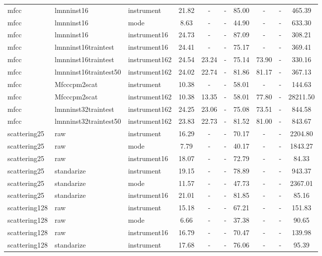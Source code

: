 \begin{table}
\begin{center}
\begin{tabular}{lllccccccc}
mfcc & lmnninst16 & instrument & 21.82 &   - &   - & 85.00 &   - &   - &    465.39 \\ 
mfcc & lmnninst16 & mode &  8.63 &   - &   - & 44.90 &   - &   - &    633.30 \\ 
mfcc & lmnninst16 & instrument16 & 24.73 &   - &   - & 87.09 &   - &   - &    308.21 \\ 
mfcc & lmnninst16traintest & instrument16 & 24.41 &   - &   - & 75.17 &   - &   - &    369.41 \\ 
mfcc & lmnninst16traintest & instrument162 & 24.54 & 23.24 &   - & 75.14 & 73.90 &   - &    330.16 \\ 
mfcc & lmnninst16traintest50 & instrument162 & 24.02 & 22.74 &   - & 81.86 & 81.17 &   - &    367.13 \\ 
mfcc & Mfcccpm2scat & instrument & 10.38 &   - &   - & 58.01 &   - &   - &    144.63 \\ 
mfcc & Mfcccpm2scat & instrument162 & 10.38 & 13.35 &   - & 58.01 & 77.80 &   - &  28211.50 \\ 
mfcc & lmnninst32traintest & instrument162 & 24.25 & 23.06 &   - & 75.08 & 73.51 &   - &    844.58 \\ 
mfcc & lmnninst32traintest50 & instrument162 & 23.83 & 22.73 &   - & 81.52 & 81.00 &   - &    843.67 \\ 
scattering25 & raw & instrument & 16.29 &   - &   - & 70.17 &   - &   - &   2204.80 \\ 
scattering25 & raw & mode &  7.79 &   - &   - & 40.17 &   - &   - &   1843.27 \\ 
scattering25 & raw & instrument16 & 18.07 &   - &   - & 72.79 &   - &   - &     84.33 \\ 
scattering25 & standarize & instrument & 19.15 &   - &   - & 78.89 &   - &   - &    943.37 \\ 
scattering25 & standarize & mode & 11.57 &   - &   - & 47.73 &   - &   - &   2367.01 \\ 
scattering25 & standarize & instrument16 & 21.01 &   - &   - & 81.85 &   - &   - &     85.16 \\ 
scattering128 & raw & instrument & 15.18 &   - &   - & 67.21 &   - &   - &    151.83 \\ 
scattering128 & raw & mode &  6.66 &   - &   - & 37.38 &   - &   - &     90.65 \\ 
scattering128 & raw & instrument16 & 16.79 &   - &   - & 70.47 &   - &   - &    139.98 \\ 
scattering128 & standarize & instrument & 17.68 &   - &   - & 76.06 &   - &   - &     95.39 \\ 

\end{tabular}
\end{center}
\end{table}
